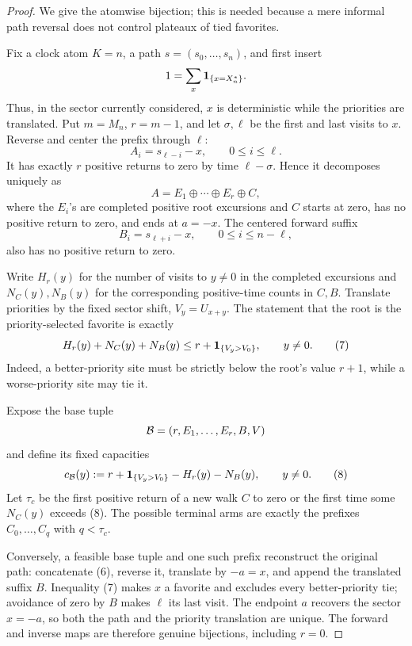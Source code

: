 \begin{proof}
We give the atomwise bijection; this is needed because a mere informal path
reversal does not control plateaux of tied favorites.

Fix a clock atom \(K=n\), a path
\(s=(s_0,\ldots,s_n)\), and first insert
\[
       1=\sum_x{\bf1}_{\{x=X_n^*\}}.
\]
Thus, in the sector currently considered, \(x\) is deterministic while the
priorities are translated.  Put \(m=M_n\), \(r=m-1\), and let
\(\sigma,\ell\) be the first and last visits to \(x\).  Reverse and center
the prefix through \(\ell\):
\[
       A_i=s_{\ell-i}-x,\qquad 0\le i\le\ell.
\]
It has exactly \(r\) positive returns to zero by time
\(\ell-\sigma\).  Hence it decomposes uniquely as
\begin{equation}
A=E_1\oplus\cdots\oplus E_r\oplus C,                    \tag{6}
\end{equation}
where the \(E_i\)'s are completed positive root excursions and \(C\)
starts at zero, has no positive return to zero, and ends at
\(a=-x\).  The centered forward suffix
\[
       B_i=s_{\ell+i}-x,\qquad 0\le i\le n-\ell,
\]
also has no positive return to zero.

Write \(H_r(y)\) for the number of visits to \(y\ne0\) in the completed
excursions and \(N_C(y),N_B(y)\) for the corresponding positive-time
counts in \(C,B\).  Translate priorities by the fixed sector shift,
\(V_y=U_{x+y}\).  The statement that the root is the priority-selected
favorite is exactly
\begin{equation}
H_r(y)+N_C(y)+N_B(y)
       \le r+{\bf1}_{\{V_y>V_0\}},\qquad y\ne0.                 \tag{7}
\end{equation}
Indeed, a better-priority site must be strictly below the root's value
\(r+1\), while a worse-priority site may tie it.

Expose the base tuple
\[
       {\cal B}=(r,E_1,\ldots,E_r,B,V)
\]
and define its fixed capacities
\begin{equation}
c_{\cal B}(y):=
       r+{\bf1}_{\{V_y>V_0\}}-H_r(y)-N_B(y),\qquad y\ne0.       \tag{8}
\end{equation}
Let \(\tau_c\) be the first positive return of a new walk \(C\) to zero or
the first time some \(N_C(y)\) exceeds (8).  The possible terminal arms
are exactly the prefixes \(C_0,\ldots,C_q\) with \(q<\tau_c\).

Conversely, a feasible base tuple and one such prefix reconstruct the
original path: concatenate (6), reverse it, translate by
\(-a=x\), and append the translated suffix \(B\).  Inequality (7) makes
\(x\) a favorite and excludes every better-priority tie; avoidance of zero
by \(B\) makes \(\ell\) its last visit.  The endpoint \(a\) recovers the
sector \(x=-a\), so both the path and the priority translation are unique.
The forward and inverse maps are therefore genuine bijections, including
\(r=0\).


\end{proof}
